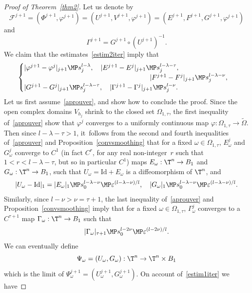 \begin{proof}[Proof of Theorem~\ref{thm2}]
Let us denote by
\[ \mathcal{F}^{j+1}=(\Phi^{j+1},\varphi^{j+1})=(U^{j+1},V^{j+1},\varphi^{j+1})=(E^{j+1},F^{j+1},G^{j+1},\varphi^{j+1}) \]
and
\[ \Gamma^{j+1}=G^{j+1} \circ (U^{j+1})^{-1}. \]
We claim that the estimates~\eqref{estim2iter} imply that
\begin{equation}\label{aprouver}
\begin{cases}
|\varphi^{j+1}-\varphi^j|_{j+1} \MP s_j^{l-\lambda}, \quad |E^{j+1}-E^j|_{j+1} \MP s_j^{l-\lambda-\tau}, \\
\hspace*{6.5cm} |F^{j+1}-F^j|_{j+1} \MP s_j^{l-\lambda-\nu}, \\
|G^{j+1}-G^j|_{j+1} \MP s_j^{l-\lambda-\tau}, \quad |\Gamma^{j+1}-\Gamma^j|_{j+1} \MP s_j^{l-\nu}.
\end{cases}
\end{equation}
Let us first assume~\eqref{aprouver}, and show how to conclude the proof. Since the open complex domains $V_{h_j}$ shrink to the closed set $\Omega_{1,\tau}$, the first inequality of~\eqref{aprouver} show that $\varphi^j$ converges to a uniformly continuous map $\varphi : \Omega_{1,\tau} \to \tilde{\Omega}$. Then since $l-\lambda-\tau>1$, it~follows from the second and fourth inequalities of~\eqref{aprouver} and Proposition~\ref{convsmoothing} that for a fixed $\omega \in \Omega_{1,\tau}$, $E_\omega^j$ and $G_\omega^j$ converge to $C^1$ (in fact $C^r$, for any real non-integer~$r$ such that $1<r<l-\lambda-\tau$, but so in particular $C^1$) maps $E_\omega : \T^n \to B_1$ and $G_\omega : \T^n \to B_1$, such that $U_\omega=\mathrm{Id}+E_\omega$ is a diffeomorphism of $\T^n$, and
\begin{equation}\label{est1}
|U_\omega-\mathrm{Id}|_1=|E_\omega|_1 \MP s_0^{l-\lambda-\nu} \MP \varepsilon^{(l-\lambda-\nu)/l}, \quad |G_\omega|_{1} \MP s_0^{l-\lambda-\nu} \MP \varepsilon^{(l-\lambda-\nu)/l}.
\end{equation}
Similarly, since $l-\nu>\nu=\tau+1$, the last inequality of~\eqref{aprouver} and Proposition~\ref{convsmoothing} imply that for a fixed $\omega \in \Omega_{1,\tau}$, $\Gamma_\omega^j$ converges to a $C^{\tau+1}$ map $\Gamma_\omega : \T^n \to B_1$ such that%
\begin{equation}\label{est2}
|\Gamma_\omega|_{\tau+1} \MP s_0^{l-2\nu} \MP \varepsilon^{(l-2\nu)/l}.
\end{equation}
We can eventually define
\[ \Psi_\omega=(U_\omega,G_\omega) : \T^n \to \T^n \times B_1 \]
which is the limit of $\Psi_\omega^{j+1}=(U_\omega^{j+1},G_\omega^{j+1})$. On account of~\eqref{estim1iter} we have

\end{proof}
